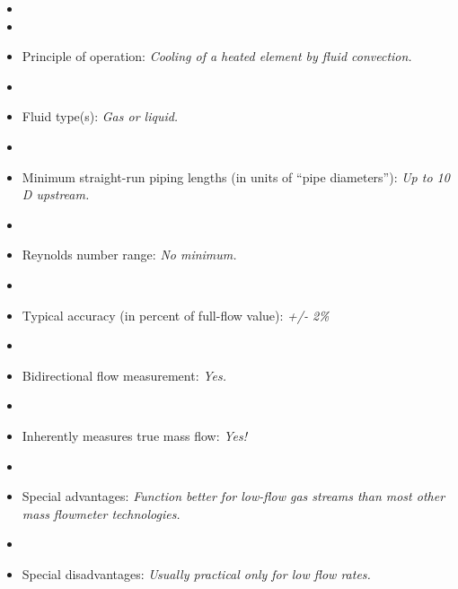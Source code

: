 \begin{itemize}
\goodbreak
\item{} 
\vskip 5pt
\item\item{} Principle of operation: {\it Cooling of a heated element by fluid convection.}
\vskip 5pt
\item\item{} Fluid type(s): {\it Gas or liquid.}
\vskip 5pt
\item\item{} Minimum straight-run piping lengths (in units of ``pipe diameters''): {\it Up to 10 D upstream.}
\vskip 5pt
\item\item{} Reynolds number range: {\it No minimum.}
\vskip 5pt
\item\item{} Typical accuracy (in percent of full-flow value): {\it +/- 2\%}
\vskip 5pt
\item\item{} Bidirectional flow measurement: {\it Yes.}
\vskip 5pt
\item\item{} Inherently measures true mass flow: {\it Yes!}
\vskip 5pt
\item\item{} Special advantages: {\it Function better for low-flow gas streams than most other mass flowmeter technologies.}
\vskip 5pt
\item\item{} Special disadvantages: {\it Usually practical only for low flow rates.}
\end{itemize}

